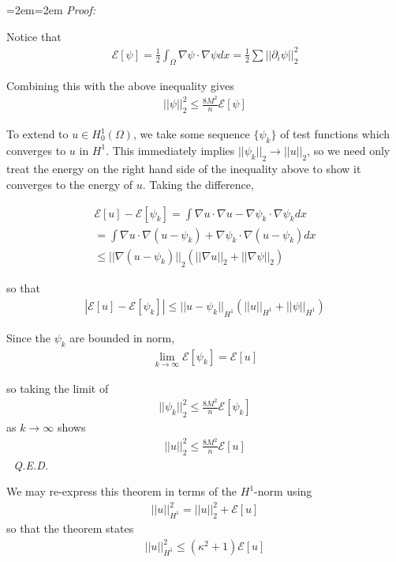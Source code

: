 \documentclass{article}
\newcommand{ \norm }[1]{{ || {#1}||}}
\newcommand{\pd}{\partial}
\newenvironment{pf}{%
	\par%
	\medskip
	\leftskip=2em\rightskip=2em%
	\noindent\ignorespaces \textit{Proof:} \newline}{%
	\,\, \newline \textit{Q.E.D.}\par\medskip}
\begin{document}
\begin{pf}
		
		Notice that 
		\begin{align*}
			\mathcal{E}[\psi] = \frac{1}{2} \int_{\Omega} \nabla \psi \cdot \nabla \psi dx = \frac{1}{2} \sum \norm{\pd_{i} \psi}_{2}^{2}
		\end{align*}
		
		Combining this with the above inequality gives 
		\begin{align*}
			\norm{\psi}_{2}^{2} \leq \frac{8M^{2}}{n} \mathcal{E}[\psi]
		\end{align*}
		
		To extend to $u \in H^{1}_{0}(\Omega)$, we take some sequence $\{\psi_{k}\}$ of test functions which converges to $u$ in $H^{1}$. This immediately implies $\norm{\psi_{k}}_{2} \to \norm{u}_{2}$, so we need only treat the energy on the right hand side of the inequality above to show it converges to the energy of $u$. Taking the difference,
		
		\begin{align*}
			\mathcal{E}[u] -\mathcal{E}[\psi_{k}] = \int \nabla u \cdot \nabla u - \nabla \psi_{k} \cdot \nabla \psi_{k}dx \\
			= \int \nabla u \cdot \nabla( u - \psi_{k}) + \nabla \psi_{k} \cdot \nabla (u-\psi_{k}) dx\\
			\leq \norm{\nabla (u-\psi_{k})}_{2} ( \norm{\nabla u}_{2} + \norm{\nabla \psi}_{2})
		\end{align*}
		
		so that 
		\begin{align*}
			|\mathcal{E}[u] - \mathcal{E}[\psi_{k}] | \leq \norm{u - \psi_{k}}_{H^{1}}(\norm{u}_{H^{1}} + \norm{\psi}_{H^{1}})
		\end{align*}
		
		Since the $\psi_{k}$ are bounded in norm, 
		\begin{align*}
			\lim_{k \to \infty} \mathcal{E}[\psi_{k}] = \mathcal{E}[u]
		\end{align*}
		
		so taking the limit of 
		\begin{align*}
			\norm{\psi_{k}}_{2}^{2} \leq \frac{8M^{2}}{n} \mathcal{E}[\psi_{k}]
		\end{align*}
		as $k \to \infty$ shows 
		\begin{align*}
			\norm{u}_{2}^{2} \leq \frac{8M^{2}}{n} \mathcal{E}[u]
		\end{align*}
	\end{pf}
	
	
	We may re-express this theorem in terms of the $H^{1}$-norm using
	\begin{align*}
		\norm{u}_{H^{1}}^{2} = \norm{u}_{2}^{2} + \mathcal{E}[u]
	\end{align*}
	so that the theorem states 
	\begin{align*}
		\norm{u}_{H^{1}}^{2} \leq (\kappa^{2}+1) \mathcal{E}[u]
	\end{align*}
	
\end{document}
